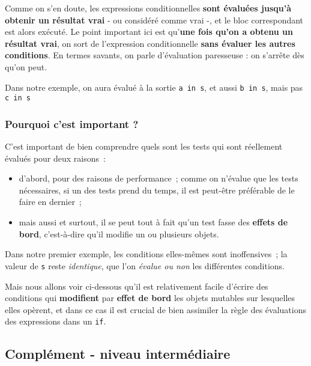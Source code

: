     Comme on s'en doute, les expressions conditionnelles \textbf{sont
évaluées jusqu'à obtenir un résultat vrai} - ou considéré comme vrai -,
et le bloc correspondant est alors exécuté. Le point important ici est
qu'\textbf{une fois qu'on a obtenu un résultat vrai}, on sort de
l'expression conditionnelle \textbf{sans évaluer les autres conditions}.
En termes savants, on parle d'évaluation paresseuse : on s'arrête dès
qu'on peut.

    Dans notre exemple, on aura évalué à la sortie
\texttt{\textquotesingle{}a\textquotesingle{}\ in\ s}, et aussi
\texttt{\textquotesingle{}b\textquotesingle{}\ in\ s}, mais pas
\texttt{\textquotesingle{}c\textquotesingle{}\ in\ s}

    \hypertarget{pourquoi-cest-important}{%
\subsubsection{Pourquoi c'est important
?}\label{pourquoi-cest-important}}

    C'est important de bien comprendre quels sont les tests qui sont
réellement évalués pour deux raisons~:

\begin{itemize}
\tightlist
\item
  d'abord, pour des raisons de performance~; comme on n'évalue que les
  tests nécessaires, si un des tests prend du temps, il est peut-être
  préférable de le faire en dernier~;
\item
  mais aussi et surtout, il se peut tout à fait qu'un test fasse des
  \textbf{effets de bord}, c'est-à-dire qu'il modifie un ou plusieurs
  objets.
\end{itemize}

    Dans notre premier exemple, les conditions elles-mêmes sont
inoffensives~; la valeur de \texttt{s} reste \emph{identique}, que l'on
\emph{évalue ou non} les différentes conditions.

Mais nous allons voir ci-dessous qu'il est relativement facile d'écrire
des conditions qui \textbf{modifient} par \textbf{effet de bord} les
objets mutables sur lesquelles elles opèrent, et dans ce cas il est
crucial de bien assimiler la règle des évaluations des expressions dans
un \texttt{if}.

    \hypertarget{compluxe9ment---niveau-intermuxe9diaire}{%
\subsection{Complément - niveau
intermédiaire}\label{compluxe9ment---niveau-intermuxe9diaire}}

